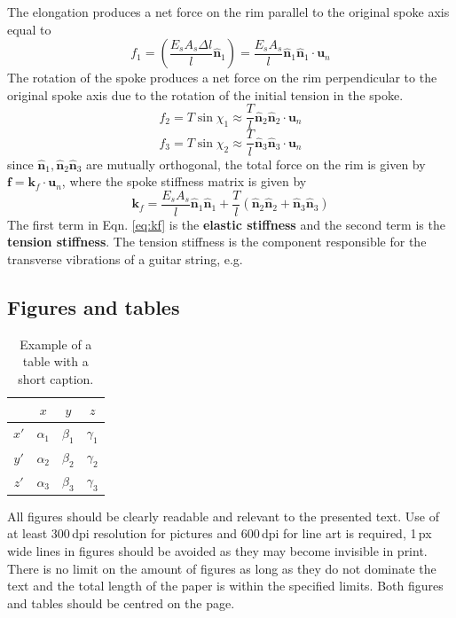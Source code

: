 \documentclass{bmd2016p}
\begin{document}
The elongation produces a net force on the rim parallel to the original spoke axis equal to
\begin{equation}\label{eq:sF1}
f_1 = \left(\frac{E_sA_s\Delta l}{l}\hat{\bm{n}}_1\right) = \frac{E_sA_s}{l} \hat{\bm{n}}_1 \hat{\bm{n}}_1 \cdot \bm{u}_n 
\end{equation}
The rotation of the spoke produces a net force on the rim perpendicular to the original spoke axis due to the rotation of the initial tension in the spoke.
\begin{equation}\label{eq:sF2}
f_2 = T \sin{\chi_1} \approx \frac{T}{l} \hat{\bm{n}}_2\hat{\bm{n}}_2 \cdot \bm{u}_n
\end{equation}
\begin{equation}\label{eq:sF3}
f_3 = T \sin{\chi_2} \approx \frac{T}{l} \hat{\bm{n}}_3\hat{\bm{n}}_3 \cdot \bm{u}_n
\end{equation}
since $\hat{\bm{n}}_1,\hat{\bm{n}}_2\hat{\bm{n}}_3$ are mutually orthogonal, the total force on the rim is given by $\bm{f} = \bm{k}_f \cdot \bm{u}_n$, where the spoke stiffness matrix is given by
\begin{equation}\label{eq:kf}
\bm{k}_f = \frac{E_sA_s}{l}\hat{\bm{n}}_1\hat{\bm{n}}_1 + \frac{T}{l}(\hat{\bm{n}}_2\hat{\bm{n}}_2 + \hat{\bm{n}}_3\hat{\bm{n}}_3)
\end{equation}
The first term in Eqn. \ref{eq:kf} is the {\bf elastic stiffness} and the second term is the {\bf tension stiffness}. The tension stiffness is the component responsible for the transverse vibrations of a guitar string, e.g.

\subsection{Figures and tables}

\begin{table}[h!]
\begin{center}
\caption{Example of a table with a short caption.} \label{tab:tab1}
\begin{tabular}{|c|ccc|}
\hline
    &  $x$  &  $y$  &  $z$ \\
\hline
$x'$  &  $\alpha_1$ & $\beta_1$ & $\gamma_1$ \\
$y'$  &  $\alpha_2$ & $\beta_2$ & $\gamma_2$ \\
$z'$  &  $\alpha_3$ & $\beta_3$ & $\gamma_3$ \\
\hline
\end{tabular}
\end{center}
\end{table}
All figures should be clearly readable and relevant to the presented text. Use 
of at least 300\,dpi resolution for pictures and 600\,dpi for line art is 
required, 1\,px wide lines in figures should be avoided as they may become 
invisible in print. There is no limit on the amount of figures as long as they 
do not dominate the text and the total length of the paper is within the 
specified limits. Both figures and tables should be centred on the page.
\end{document}
